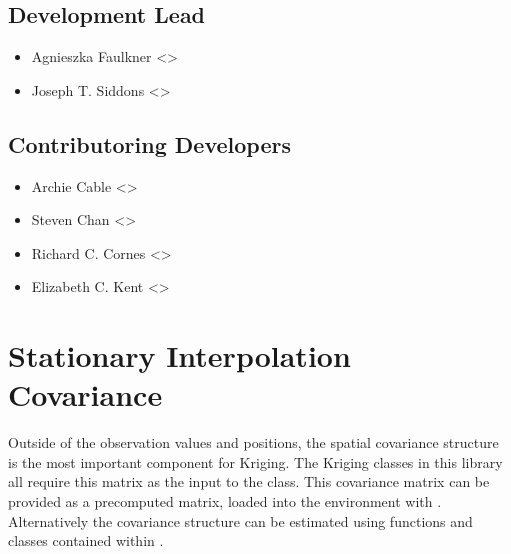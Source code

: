 \documentclass[letterpaper,10pt,english]{sphinxmanual}
\begin{document}
\section{Development Lead}
\label{\detokenize{authors:development-lead}}\begin{itemize}
\item {}
\sphinxAtStartPar
Agnieszka Faulkner \textless{}\textgreater{} 

\item {}
\sphinxAtStartPar
Joseph T. Siddons \textless{}\textgreater{} 

\end{itemize}


\section{Contributoring Developers}
\label{\detokenize{authors:contributoring-developers}}\begin{itemize}
\item {}
\sphinxAtStartPar
Archie Cable \textless{}\textgreater{} 

\item {}
\sphinxAtStartPar
Steven Chan \textless{}\textgreater{} 

\item {}
\sphinxAtStartPar
Richard C. Cornes \textless{}\textgreater{} 

\item {}
\sphinxAtStartPar
Elizabeth C. Kent \textless{}\textgreater{} 

\end{itemize}

\sphinxstepscope


\chapter{Stationary Interpolation Covariance}
\label{\detokenize{covariance:stationary-interpolation-covariance}}\label{\detokenize{covariance::doc}}
\sphinxAtStartPar
Outside of the observation values and positions, the spatial covariance structure is the most
important component for Kriging. The Kriging classes in this library all require this matrix as the
input to the class. This covariance matrix can be provided as a pre\sphinxhyphen{}computed matrix, loaded into the
environment with {\hyperref[\detokenize{covariance:glomar_gridding.interpolation_covariance.load_covariance}]{}}. Alternatively
the covariance structure can be estimated using functions and classes contained within
.
\end{document}
